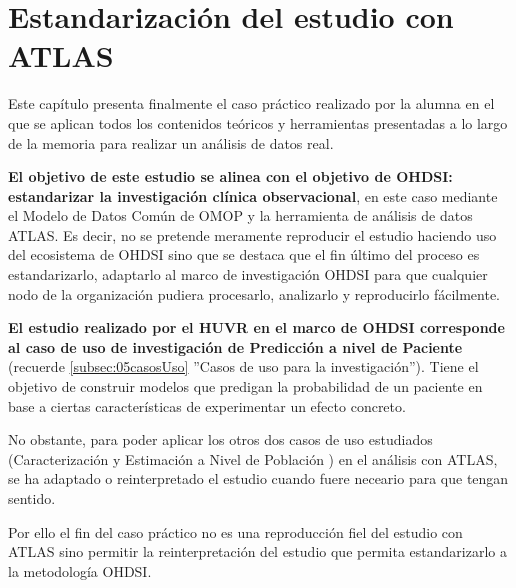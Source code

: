 \section{Estandarización del estudio con ATLAS} \label{sec:09atlas}

Este capítulo presenta finalmente el caso práctico realizado por la alumna en el que se aplican todos los contenidos teóricos y herramientas presentadas a lo largo de la memoria para realizar un análisis de datos real.


\textbf{El objetivo de este estudio se alinea con el objetivo de OHDSI: estandarizar la investigación clínica observacional}, en este caso mediante el Modelo de Datos Común de OMOP y la herramienta de análisis de datos ATLAS. Es decir, no se pretende meramente reproducir el estudio haciendo uso del ecosistema de OHDSI sino que se destaca que el fin último del proceso es estandarizarlo, adaptarlo al marco de investigación OHDSI para que cualquier nodo de la organización pudiera procesarlo, analizarlo y reproducirlo fácilmente. 


\textbf{El estudio realizado por el HUVR en el marco de OHDSI corresponde al caso de uso de investigación de Predicción a nivel de Paciente} (recuerde \ref{subsec:05casosUso} ''Casos de uso para la investigación''). Tiene el objetivo de construir modelos que predigan la probabilidad de un paciente en base a ciertas características de experimentar un efecto concreto. 

No obstante, para poder aplicar los otros dos casos de uso estudiados (Caracterización y Estimación a Nivel de Población ) en el análisis con ATLAS, se ha adaptado o reinterpretado el estudio cuando fuere neceario para que tengan sentido. 

Por ello el fin del caso práctico no es una reproducción fiel del estudio con ATLAS sino permitir la reinterpretación del estudio que permita estandarizarlo a la metodología OHDSI.





